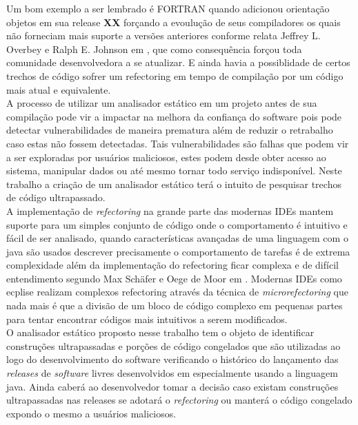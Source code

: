 Um bom exemplo a ser lembrado é FORTRAN quando adicionou orientação objetos em sua release \textbf{XX} forçando a evoulução de seus compiladores os quais não forneciam mais suporte a versões anteriores conforme relata Jeffrey L. Overbey e Ralph E. Johnson em  \cite{Overbey:2009:RLR:1639949.1640127}, que como consequência forçou toda comunidade desenvolvedora a se atualizar. E ainda havia a possiblidade de certos trechos de código sofrer um refectoring em tempo de compilação por um código mais atual e equivalente.\\

A processo de utilizar um analisador estático em um projeto antes de sua compilação pode vir a impactar na melhora da confiança do software pois pode detectar vulnerabilidades de maneira prematura além de reduzir o retrabalho caso estas não fossem detectadas. Tais vulnerabilidades são falhas que podem vir a ser exploradas por usuários maliciosos, estes podem desde obter acesso ao sistema, manipular dados ou até mesmo tornar todo serviço indisponível. Neste trabalho a criação de um analisador estático terá o intuito de pesquisar trechos de código ultrapassado.\\

A implementação de {\it refectoring} na grande parte das modernas IDEs mantem suporte para um simples conjunto de código onde o comportamento é intuitivo e fácil de ser analisado,  quando características avançadas de uma linguagem com o java são usados descrever precisamente o comportamento de tarefas é de extrema complexidade além da implementação do refectoring ficar complexa e de difícil entendimento segundo Max Schäfer e Oege de Moor em  \cite{Schaefer:2010:SIR:1932682.1869485}. Modernas IDEs como ecplise realizam complexos refectoring através da técnica de {\it microrefectoring} que nada mais é que a divisão de um bloco de código complexo em pequenas partes para tentar encontrar códigos mais intuitivos a serem modificados.\\

O analisador estático proposto nesse trabalho tem o objeto de identificar construções ultrapassadas e porções de código congelados que são utilizadas ao logo do desenvolvimento do software verificando o histórico do lançamento das {\it releases} de {\it software} livres desenvolvidos em especialmente usando a linguagem java. Ainda caberá ao desenvolvedor tomar a decisão caso existam construções ultrapassadas nas releases se adotará o {\it refectoring} ou manterá o código congelado expondo o mesmo a usuários maliciosos.\\




